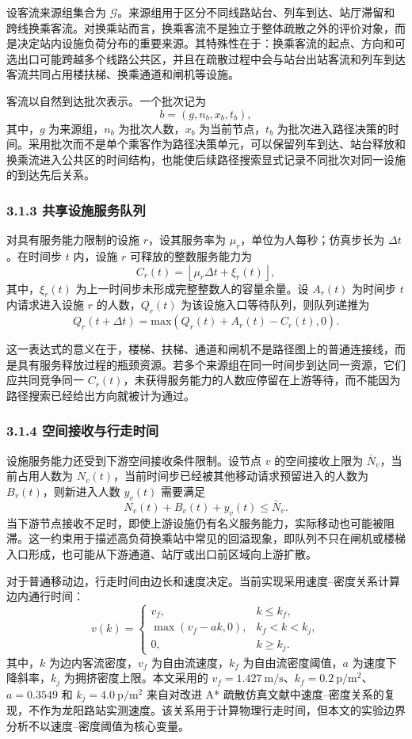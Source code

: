 \documentclass[UTF8,a4paper,12pt]{ctexart}
\begin{document}
设客流来源组集合为 \(\mathcal{G}\)。来源组用于区分不同线路站台、列车到达、站厅滞留和跨线换乘客流。对换乘站而言，换乘客流不是独立于整体疏散之外的评价对象，而是决定站内设施负荷分布的重要来源。其特殊性在于：换乘客流的起点、方向和可选出口可能跨越多个线路公共区，并且在疏散过程中会与站台出站客流和列车到达客流共同占用楼扶梯、换乘通道和闸机等设施。

客流以自然到达批次表示。一个批次记为
\[
b=(g,n_b,x_b,t_b),
\]
其中，\(g\) 为来源组，\(n_b\) 为批次人数，\(x_b\) 为当前节点，\(t_b\) 为批次进入路径决策的时间。采用批次而不是单个乘客作为路径决策单元，可以保留列车到达、站台释放和换乘流进入公共区的时间结构，也能使后续路径搜索显式记录不同批次对同一设施的到达先后关系。

\subsubsection{3.1.3 共享设施服务队列}

对具有服务能力限制的设施 \(r\)，设其服务率为 \(\mu_r\)，单位为人每秒；仿真步长为 \(\Delta t\)。在时间步 \(t\) 内，设施 \(r\) 可释放的整数服务能力为
\[
C_r(t)=\left\lfloor \mu_r\Delta t+\xi_r(t)\right\rfloor ,
\]
其中，\(\xi_r(t)\) 为上一时间步未形成完整整数人的容量余量。设 \(A_r(t)\) 为时间步 \(t\) 内请求进入设施 \(r\) 的人数，\(Q_r(t)\) 为该设施入口等待队列，则队列递推为
\[
Q_r(t+\Delta t)=\mathrm{max}\left(Q_r(t)+A_r(t)-C_r(t),0\right).
\]

这一表达式的意义在于，楼梯、扶梯、通道和闸机不是路径图上的普通连接线，而是具有服务释放过程的瓶颈资源。若多个来源组在同一时间步到达同一资源，它们应共同竞争同一 \(C_r(t)\)，未获得服务能力的人数应停留在上游等待，而不能因为路径搜索已经给出方向就被计为通过。

\subsubsection{3.1.4 空间接收与行走时间}

设施服务能力还受到下游空间接收条件限制。设节点 \(v\) 的空间接收上限为 \(\bar N_v\)，当前占用人数为 \(N_v(t)\)，当前时间步已经被其他移动请求预留进入的人数为 \(B_v(t)\)，则新进入人数 \(y_v(t)\) 需要满足
\[
N_v(t)+B_v(t)+y_v(t)\leq \bar N_v .
\]
当下游节点接收不足时，即使上游设施仍有名义服务能力，实际移动也可能被阻滞。这一约束用于描述高负荷换乘站中常见的回溢现象，即队列不只在闸机或楼梯入口形成，也可能从下游通道、站厅或出口前区域向上游扩散。

对于普通移动边，行走时间由边长和速度决定。当前实现采用速度--密度关系计算边内通行时间：
\[
v(k)=
\begin{cases}
v_f, & k\leq k_f,\\
\max(v_f-ak,0), & k_f<k<k_j,\\
0, & k\geq k_j .
\end{cases}
\]
其中，\(k\) 为边内客流密度，\(v_f\) 为自由流速度，\(k_f\) 为自由流密度阈值，\(a\) 为速度下降斜率，\(k_j\) 为拥挤密度上限。本文采用的 \(v_f=1.427\ \mathrm{m/s}\)、\(k_f=0.2\ \mathrm{p/m^2}\)、\(a=0.3549\) 和 \(k_j=4.0\ \mathrm{p/m^2}\) 来自对改进 A* 疏散仿真文献中速度--密度关系的复现，不作为龙阳路站实测速度。该关系用于计算物理行走时间，但本文的实验边界分析不以速度--密度阈值为核心变量。
\end{document}

